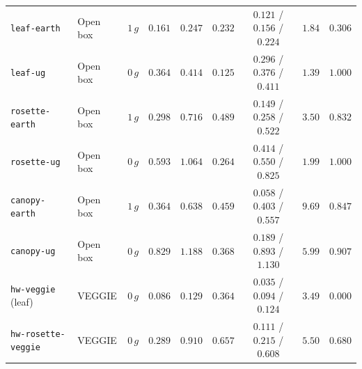 \documentclass[preprint,11pt,numbers,sort&compress]{elsarticle}
\begin{document}
\begin{table}[htbp]
{\begin{tabular}{llccccccc}
\midrule
\texttt{leaf-earth} & Open box & $1\,g$ & $0.161$ & $0.247$ & $0.232$ & $0.121$ / $0.156$ / $0.224$ & $1.84$ & $0.306$ \\
\texttt{leaf-ug} & Open box & $0\,g$ & $0.364$ & $0.414$ & $0.125$ & $0.296$ / $0.376$ / $0.411$ & $1.39$ & $1.000$ \\
\texttt{rosette-earth} & Open box & $1\,g$ & $0.298$ & $0.716$ & $0.489$ & $0.149$ / $0.258$ / $0.522$ & $3.50$ & $0.832$ \\
\texttt{rosette-ug} & Open box & $0\,g$ & $0.593$ & $1.064$ & $0.264$ & $0.414$ / $0.550$ / $0.825$ & $1.99$ & $1.000$ \\
\texttt{canopy-earth} & Open box & $1\,g$ & $0.364$ & $0.638$ & $0.459$ & $0.058$ / $0.403$ / $0.557$ & $9.69$ & $0.847$ \\
\texttt{canopy-ug} & Open box & $0\,g$ & $0.829$ & $1.188$ & $0.368$ & $0.189$ / $0.893$ / $1.130$ & $5.99$ & $0.907$ \\
\texttt{hw-veggie} (leaf) & VEGGIE & $0\,g$ & $0.086$ & $0.129$ & $0.364$ & $0.035$ / $0.094$ / $0.124$ & $3.49$ & $0.000$ \\
\texttt{hw-rosette-veggie} & VEGGIE & $0\,g$ & $0.289$ & $0.910$ & $0.657$ & $0.111$ / $0.215$ / $0.608$ & $5.50$ & $0.680$ \\
\bottomrule
\end{tabular}%
}
\end{table}
\end{document}
